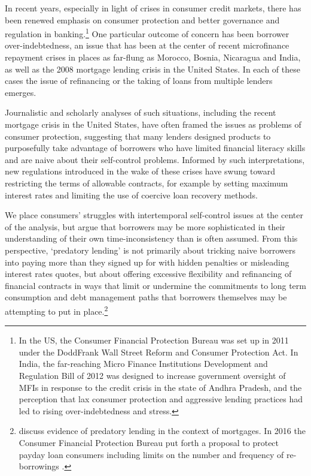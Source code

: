 \documentclass[11pt,english]{article}
\theoremstyle{plain}
\theoremstyle{definition}
\begin{document}
In recent years, especially in light of crises in consumer credit
markets, there has been renewed emphasis on consumer protection and
better governance and regulation in banking.\footnote{In the US, the Consumer Financial Protection Bureau was set up in
2011 under the Dodd\textendash Frank Wall Street Reform and Consumer
Protection Act. In India, the far-reaching Micro Finance Institutions
Development and Regulation Bill of 2012 was designed to increase government
oversight of MFIs in response to the credit crisis in the state of
Andhra Pradesh, and the perception that lax consumer protection and
aggressive lending practices had led to rising over-indebtedness and
stress.} One particular outcome of concern has been borrower over-indebtedness,
an issue that has been at the center of recent microfinance repayment
crises in places as far-flung as Morocco, Bosnia, Nicaragua and India,
as well as the 2008 mortgage lending crisis in the United States.
In each of these cases the issue of refinancing or the taking of loans
from multiple lenders emerges.

Journalistic and scholarly analyses of such situations, including
the recent mortgage crisis in the United States, have often framed
the issues as problems of consumer protection, suggesting that many
lenders designed products to purposefully take advantage of borrowers
who have limited financial literacy skills and are naive about their
self-control problems. Informed by such interpretations, new regulations
introduced in the wake of these crises have swung toward restricting
the terms of allowable contracts, for example by setting maximum interest
rates and limiting the use of coercive loan recovery methods.

We place consumers' struggles with intertemporal self-control issues
at the center of the analysis, but argue that borrowers may be more
sophisticated in their understanding of their own time-inconsistency
than is often assumed. From this perspective, `predatory lending'
is not primarily about tricking naive borrowers into paying more than
they signed up for with hidden penalties or misleading interest rates
quotes, but about offering excessive flexibility and refinancing of
financial contracts in ways that limit or undermine the commitments
to long term consumption and debt management paths that borrowers
themselves may be attempting to put in place.\footnote{\citet{bond2009} discuss evidence of predatory lending in the context
of mortgages. In 2016 the Consumer Financial Protection Bureau put
forth a proposal to protect payday loan consumers including limits
on the number and frequency of re-borrowings \citep{cfpb2016}.}
\end{document}
